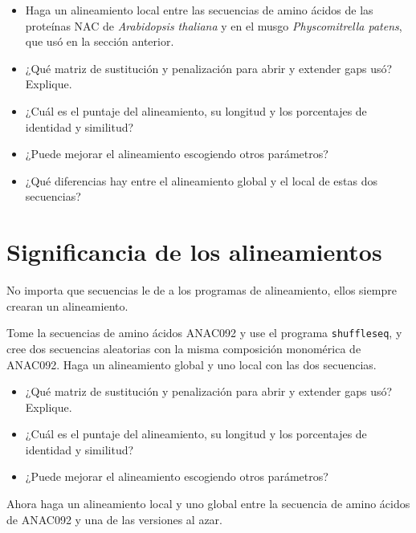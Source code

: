 \documentclass[letter,11pt]{book}
\begin{document}
{\color{red}
\begin{itemize}
\item Haga un alineamiento local entre las secuencias de amino ácidos de las proteínas NAC de \textit{Arabidopsis thaliana} y en el musgo \textit{Physcomitrella patens}, que usó en la sección anterior.
\item ¿Qué matriz de sustitución y penalización para abrir y extender gaps usó? Explique.
\item ¿Cuál es el puntaje del alineamiento, su longitud y los porcentajes de identidad y similitud?
\item ¿Puede mejorar el alineamiento escogiendo otros parámetros?
\item ¿Qué diferencias hay entre el alineamiento global y el local de estas dos secuencias?
\end{itemize}
}

\section{Significancia de los alineamientos}

No importa que secuencias le de a los programas de alineamiento, ellos siempre crearan un alineamiento.

Tome la secuencias de amino ácidos ANAC092 y use el programa \Verb+shuffleseq+, y cree dos secuencias aleatorias con la misma composición monomérica de ANAC092. Haga un alineamiento global  y uno local con las dos secuencias.

{\color{red}
\begin{itemize}
\item ¿Qué matriz de sustitución y penalización para abrir y extender gaps usó? Explique.
\item ¿Cuál es el puntaje del alineamiento, su longitud y los porcentajes de identidad y similitud?
\item ¿Puede mejorar el alineamiento escogiendo otros parámetros?
\end{itemize}
}

Ahora haga un alineamiento local y uno global entre la secuencia de amino ácidos de ANAC092 y una de las versiones al azar.
\end{document}
